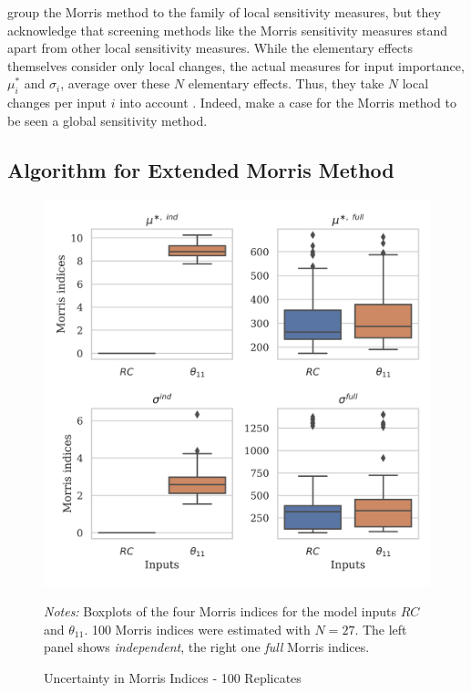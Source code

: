 \citet{BP16} group the Morris method to the family of local sensitivity measures, but they acknowledge that screening methods like the Morris sensitivity measures stand apart from other local sensitivity measures. While the elementary effects themselves consider only local changes, the actual measures for input importance, $\mu_i^\ast$ and $\sigma_i$, average over these $N$ elementary effects. Thus, they take $N$ local changes per input $i$ into account \citep{M91}. Indeed, \citet{CCS11} make a case for the Morris method to be seen a global sensitivity method.

\subsection{Algorithm for Extended Morris Method}

\begin{figure}[t]
	\caption{Uncertainty in Morris Indices - 100 Replicates}
    \label{morris_replicates}
    \begin{centering}
	\vspace*{-4mm}
	\begin{centering}
	\includegraphics[scale=0.9]{../figures/boxplot_morris_replicates_100_replicates_27_draws.png}
    \end{centering}
    \end{centering}

    \small
    \textit{Notes:} Boxplots of the four Morris indices for the model inputs $RC$ and $\theta_{11}$. 100 Morris indices were estimated with $N=27$. The left panel shows \textit{independent}, the right one \textit{full} Morris indices.
\end{figure}

